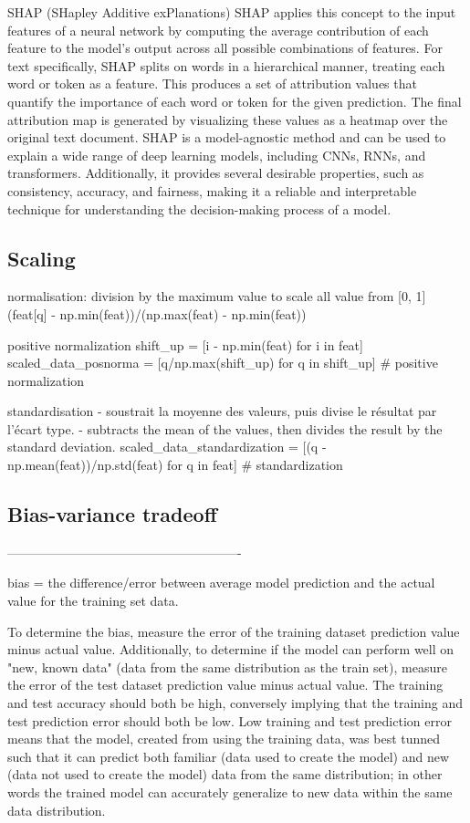 \documentclass[11pt, onecolumn]{article}
\begin{document}
SHAP (SHapley Additive exPlanations) 
SHAP applies this concept to the input features of a neural network by computing the average contribution of each feature to the model's output across all possible combinations of features. For text specifically, SHAP splits on words in a hierarchical manner, treating each word or token as a feature. This produces a set of attribution values that quantify the importance of each word or token for the given prediction. The final attribution map is generated by visualizing these values as a heatmap over the original text document. SHAP is a model-agnostic method and can be used to explain a wide range of deep learning models, including CNNs, RNNs, and transformers. Additionally, it provides several desirable properties, such as consistency, accuracy, and fairness, making it a reliable and interpretable technique for understanding the decision-making process of a model.


\subsection{Scaling}

normalisation: division by the maximum value to scale all value from [0, 1]
(feat[q] - np.min(feat))/(np.max(feat) - np.min(feat))

positive normalization
shift_up = [i - np.min(feat) for i in feat]
scaled_data_posnorma = [q/np.max(shift_up) for q in shift_up]  # positive normalization 

standardisation
	- soustrait la moyenne des valeurs, puis divise le résultat par l’écart type.
	- subtracts the mean of the values, then divides the result by the standard deviation.
scaled_data_standardization = [(q - np.mean(feat))/np.std(feat) for q in feat]  # standardization



\subsection{Bias-variance tradeoff}

-------------------------------------------------------

bias = the difference/error between average model prediction and the actual value for the training set data.

To determine the bias, measure the error of the training dataset prediction value minus actual value. Additionally, to determine if the model can perform well on "new, known data" (data from the same distribution as the train set), measure the error of the test dataset prediction value minus actual value. The training and test accuracy should both be high, conversely implying that the training and test prediction error should both be low. Low training and test prediction error means that the model, created from using the training data, was best tunned such that it can predict both familiar (data used to create the model) and new (data not used to create the model) data from the same distribution; in other words the trained model can accurately generalize to new data within the same data distribution.   
\end{document}
